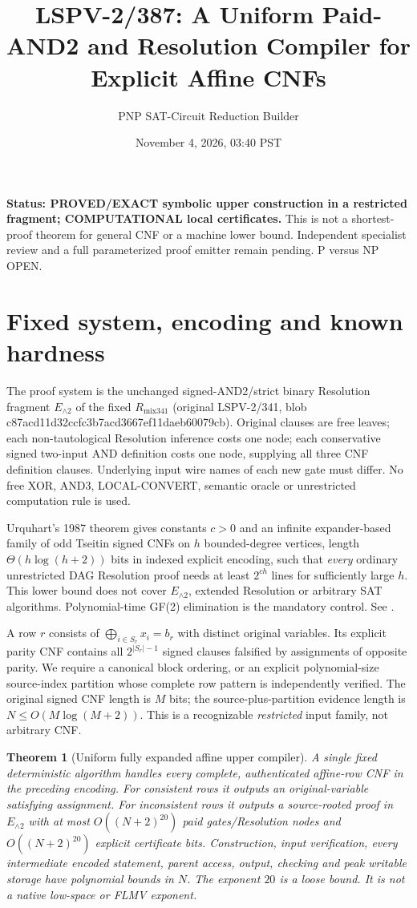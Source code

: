 \documentclass[11pt]{article}
\title{LSPV-2/387: A Uniform Paid-AND2 and Resolution Compiler for Explicit Affine CNFs}
\author{PNP SAT-Circuit Reduction Builder}
\date{November 4, 2026, 03:40 PST}
\newtheorem{theorem}{Theorem}
\begin{document}
\maketitle
\noindent\textbf{Status: PROVED/EXACT symbolic upper construction in a restricted fragment; COMPUTATIONAL local certificates.} This is not a shortest-proof theorem for general CNF or a machine lower bound. Independent specialist review and a full parameterized proof emitter remain pending. P versus NP OPEN.

\section*{Fixed system, encoding and known hardness}
The proof system is the unchanged signed-AND2/strict binary Resolution fragment $E_{\land2}$ of the fixed $R_{\mathrm{mix341}}$ (original LSPV-2/341, blob c87acd11d32ccfc3b7acd3667ef11daeb60079cb). Original clauses are free leaves; each non-tautological Resolution inference costs one node; each conservative signed two-input AND definition costs one node, supplying all three CNF definition clauses. Underlying input wire names of each new gate must differ. No free XOR, AND3, LOCAL-CONVERT, semantic oracle or unrestricted computation rule is used.

Urquhart's 1987 theorem gives constants $c>0$ and an infinite expander-based family of odd Tseitin signed CNFs on $h$ bounded-degree vertices, length $\Theta(h\log(h+2))$ bits in indexed explicit encoding, such that \emph{every} ordinary unrestricted DAG Resolution proof needs at least $2^{ch}$ lines for sufficiently large $h$. This lower bound does not cover $E_{\land2}$, extended Resolution or arbitrary SAT algorithms. Polynomial-time GF(2) elimination is the mandatory control. See \cite{Urquhart87,Cook76}.

A row $r$ consists of $\bigoplus_{i\in S_r}x_i=b_r$ with distinct original variables. Its explicit parity CNF contains all $2^{|S_r|-1}$ signed clauses falsified by assignments of opposite parity. We require a canonical block ordering, or an explicit polynomial-size source-index partition whose complete row pattern is independently verified. The original signed CNF length is $M$ bits; the source-plus-partition evidence length is $N\le O(M\log(M+2))$. This is a recognizable \emph{restricted} input family, not arbitrary CNF.

\begin{theorem}[Uniform fully expanded affine upper compiler]
A single fixed deterministic algorithm handles every complete, authenticated affine-row CNF in the preceding encoding. For consistent rows it outputs an original-variable satisfying assignment. For inconsistent rows it outputs a source-rooted proof in $E_{\land2}$ with at most $O((N+2)^{20})$ paid gates/Resolution nodes and $O((N+2)^{20})$ explicit certificate bits. Construction, input verification, every intermediate encoded statement, parent access, output, checking and peak writable storage have polynomial bounds in $N$. The exponent $20$ is a loose bound. It is \emph{not} a native low-space or FLMV exponent.
\end{theorem}
\end{document}
